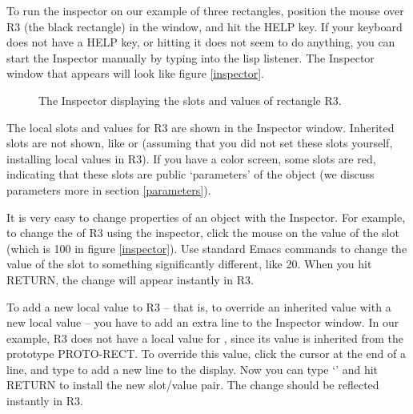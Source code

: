 To run the inspector on our example of three rectangles, position the mouse
over R3 (the black rectangle) in the window, and hit the HELP key.  If your
keyboard does not have a HELP key, or hitting it does not seem to do anything,
you can start the Inspector manually by typing  into
the lisp listener.  The Inspector window that appears will look like figure
\ref{inspector}.

\begin{figure}
\begin{center}
\begin{makeimage}
\end{makeimage}
\begin{latexonly}
\end{latexonly}
\end{center}
\caption{The Inspector displaying the slots and values of rectangle R3.}
\end{figure}

The local slots and values for R3 are shown in the Inspector window.
Inherited slots are not shown, like  or  (assuming
that you did not set these slots yourself, installing local values in R3).
If you have a color screen, some slots are red, indicating that these slots
are public `parameters' of the object (we discuss parameters more in
section \ref{parameters}).

It is very easy to change properties of an object with the Inspector.  For
example, to change the  of R3 using the inspector, click the mouse
on the value of the  slot (which is 100 in figure \ref{inspector}).
Use standard Emacs commands to change the value of the slot to something
significantly different, like 20.  When you hit RETURN, the change will appear
instantly in R3.

To add a new local value to R3 -- that is, to override an inherited value with
a new local value -- you have to add an extra line to the Inspector window.
In our example, R3 does not have a local value for , since its
value is inherited from the prototype PROTO-RECT.  To override this value,
click the cursor at the end of a line, and type  to add a new line
to the display.  Now you can type `' and hit RETURN to
install the new slot/value pair.  The change should be reflected instantly
in R3.

